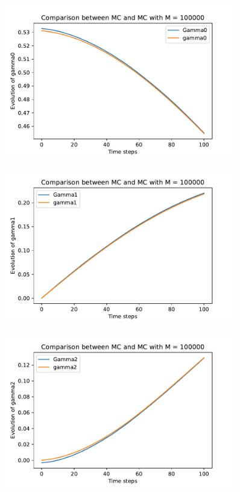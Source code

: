 \documentclass[a4paper,11pt,openright]{report}
\begin{document}
\begin{figure}[H]
\centering
\includegraphics[width=0.9\textwidth]{gamma0 MC = 100000.pdf}
\end{figure}
\begin{figure}[H]
\centering
\includegraphics[width=0.9\textwidth]{gamma1 MC = 100000.pdf}
\end{figure}
\begin{figure}[H]
\centering
\includegraphics[width=0.9\textwidth]{gamma2 MC = 100000.pdf}
\end{figure}
\end{document}
